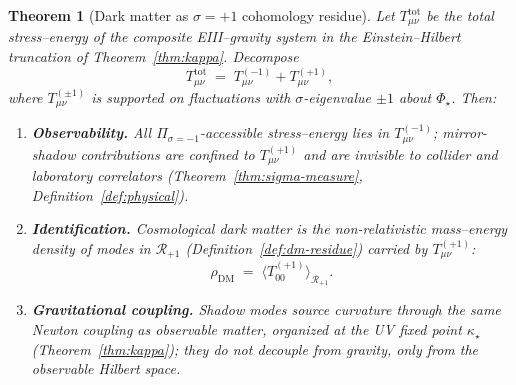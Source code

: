 \documentclass[11pt]{article}
\theoremstyle{plain}
\newtheorem{theorem}{Theorem}[section]
\theoremstyle{definition}
\theoremstyle{remark}
\numberwithin{equation}{section}
\newcommand{\orderparam}{\Phi}
\begin{document}
\begin{theorem}[Dark matter as $\sigma=+1$ cohomology residue]
\label{thm:dm-sector}
Let $T_{\mu\nu}^{\mathrm{tot}}$ be the total stress--energy of the composite
EIII--gravity system in the Einstein--Hilbert truncation of
Theorem~\ref{thm:kappa}. Decompose
\begin{equation}\label{eq:T-split}
  T_{\mu\nu}^{\mathrm{tot}}
  \;=\;
  T_{\mu\nu}^{(-1)}+T_{\mu\nu}^{(+1)},
\end{equation}
where $T_{\mu\nu}^{(\pm1)}$ is supported on fluctuations with
$\sigma$-eigenvalue $\pm1$ about $\orderparam_\star$.
Then:
\begin{enumerate}[label=(\roman*),leftmargin=*]
  \item \textbf{Observability.} All $\Pi_{\sigma=-1}$-accessible stress--energy
    lies in $T_{\mu\nu}^{(-1)}$; mirror-shadow contributions are confined to
    $T_{\mu\nu}^{(+1)}$ and are invisible to collider and laboratory correlators
    (Theorem~\ref{thm:sigma-measure}, Definition~\ref{def:physical}).
  \item \textbf{Identification.} Cosmological dark matter is the
    non-relativistic mass--energy density of modes in $\mathcal{R}_{+1}$
    (Definition~\ref{def:dm-residue}) carried by $T_{\mu\nu}^{(+1)}$:
    \begin{equation}\label{eq:dm-ident}
      \rho_{\mathrm{DM}}
      \;=\;
      \langle T_{00}^{(+1)}\rangle_{\mathcal{R}_{+1}}.
    \end{equation}
  \item \textbf{Gravitational coupling.} Shadow modes source curvature through
    the same Newton coupling as observable matter, organized at the UV fixed
    point $\kappa_\star$ (Theorem~\ref{thm:kappa}); they do not decouple from
    gravity, only from the observable Hilbert space.
\end{enumerate}
\end{theorem}
\end{document}
